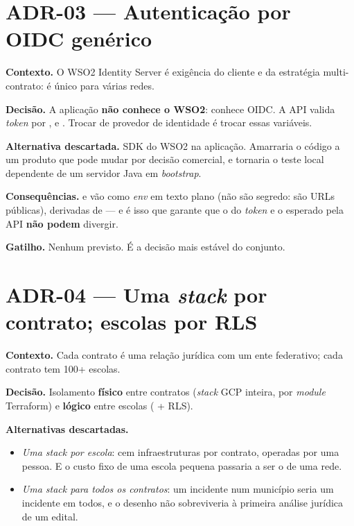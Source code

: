 \section{ADR-03 --- Autenticação por OIDC genérico}

\textbf{Contexto.} O WSO2 Identity Server é exigência do cliente e da estratégia
multi-contrato: é único para várias redes.

\textbf{Decisão.} A aplicação \textbf{não conhece o WSO2}: conhece OIDC. A API
valida \emph{token} por ,  e
. Trocar de provedor de identidade é trocar essas
variáveis.

\textbf{Alternativa descartada.} SDK do WSO2 na aplicação. Amarraria o código a um
produto que pode mudar por decisão comercial, e tornaria o teste local dependente
de um servidor Java em \emph{bootstrap}.

\textbf{Consequências.}  e  vão como
\emph{env} em texto plano (não são segredo: são URLs públicas), derivadas de
 --- e é isso que garante que o  do \emph{token} e o
esperado pela API \textbf{não podem} divergir.

\textbf{Gatilho.} Nenhum previsto. É a decisão mais estável do conjunto.

\section{ADR-04 --- Uma \emph{stack} por contrato; escolas por RLS}

\textbf{Contexto.} Cada contrato é uma relação jurídica com um ente federativo;
cada contrato tem 100+ escolas.

\textbf{Decisão.} Isolamento \textbf{físico} entre contratos (\emph{stack} GCP
inteira, por \emph{module} Terraform) e \textbf{lógico} entre escolas
( + RLS).

\textbf{Alternativas descartadas.}
\begin{itemize}
  \item \emph{Uma \emph{stack} por escola}: cem infraestruturas por contrato,
    operadas por uma pessoa. E o custo fixo de uma escola pequena passaria a ser o
    de uma rede.
  \item \emph{Uma \emph{stack} para todos os contratos}: um incidente num
    município seria um incidente em todos, e o desenho não sobreviveria à primeira
    análise jurídica de um edital.
\end{itemize}


